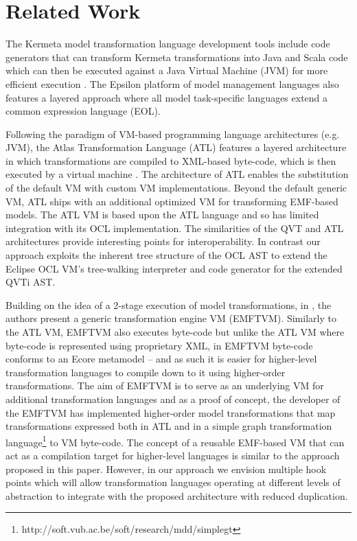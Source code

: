 \section{Related Work}\label{sec:related}

The Kermeta model transformation language development tools include code generators that can transform Kermeta transformations into Java and Scala code which can then be executed against a Java Virtual Machine (JVM) for more efficient execution \cite{Fouquet.etal2010}. The Epsilon\cite{Paige.etal2009} platform of model management languages also features a layered approach where all model task-specific languages extend a common expression language (EOL).

Following the paradigm of VM-based programming language architectures (e.g. JVM), the Atlas Transformation Language (ATL) features a layered architecture in which transformations are compiled to XML-based byte-code, which is then executed by a virtual machine \cite{ATL.VMSpec}. The architecture of ATL enables the substitution of the default VM with custom VM implementations. Beyond the default generic VM, ATL ships with an additional optimized VM for transforming EMF-based models. The ATL VM is based upon the ATL language and so has limited integration with its OCL implementation. The similarities of the QVT and ATL architectures provide interesting points for interoperability\cite{Jouault.Kurtev2006}. In contrast our approach exploits the inherent tree structure of the OCL AST to extend the Eclipse OCL VM's tree-walking interpreter and code generator for the extended QVTi AST. 

Building on the idea of a 2-stage execution of model transformations, in \cite{Wagelaar.etal2011}, the authors present a generic transformation engine VM (EMFTVM). Similarly to the ATL VM, EMFTVM also executes byte-code but unlike the ATL VM where byte-code is represented using proprietary XML, in EMFTVM byte-code conforms to an Ecore metamodel -- and as such it is easier for higher-level transformation languages to compile down to it using higher-order transformations. The aim of EMFTVM is to serve as an underlying VM for additional transformation languages and as a proof of concept, the developer of the EMFTVM has implemented higher-order model transformations that map transformations expressed both in ATL and in a simple graph transformation language\footnote{http://soft.vub.ac.be/soft/research/mdd/simplegt} to VM byte-code. The concept of a reusable EMF-based VM that can act as a compilation target for higher-level languages is similar to the approach proposed in this paper. However, in our approach we envision multiple hook points which will allow transformation languages operating at different levels of abstraction to integrate with the proposed architecture with reduced duplication.

